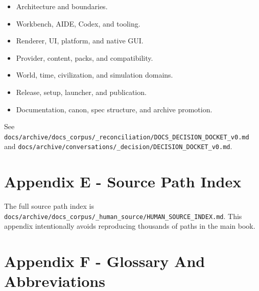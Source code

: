 \documentclass[10.5pt,a4paper,openany]{book}
\begin{document}
\begin{itemize}
\item Architecture and boundaries.\allowbreak{}
\item Workbench, AIDE, Codex, and tooling.\allowbreak{}
\item Renderer, UI, platform, and native GUI.\allowbreak{}
\item Provider, content, packs, and compatibility.\allowbreak{}
\item World, time, civilization, and simulation domains.\allowbreak{}
\item Release, setup, launcher, and publication.\allowbreak{}
\item Documentation, canon, spec structure, and archive promotion.\allowbreak{}
\end{itemize}

See \texttt{docs/\allowbreak{}archive/\allowbreak{}docs\_\allowbreak{}corpus/\allowbreak{}\_\allowbreak{}reconciliation/\allowbreak{}DOCS\_\allowbreak{}DECISION\_\allowbreak{}DOCKET\_\allowbreak{}v0.\allowbreak{}md} and \texttt{docs/\allowbreak{}archive/\allowbreak{}conversations/\allowbreak{}\_\allowbreak{}decision/\allowbreak{}DECISION\_\allowbreak{}DOCKET\_\allowbreak{}v0.\allowbreak{}md}.\allowbreak{}


\section{Appendix E - Source Path Index}

The full source path index is \texttt{docs/\allowbreak{}archive/\allowbreak{}docs\_\allowbreak{}corpus/\allowbreak{}\_\allowbreak{}human\_\allowbreak{}source/\allowbreak{}HUMAN\_\allowbreak{}SOURCE\_\allowbreak{}INDEX.\allowbreak{}md}.\allowbreak{} This appendix intentionally avoids reproducing thousands of paths in the main book.\allowbreak{}


\section{Appendix F - Glossary And Abbreviations}
\end{document}
